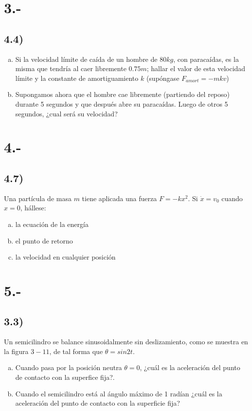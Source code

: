\documentclass{article}
\begin{document}
\section*{3.-}
\subsection*{4.4)}
\begin{enumerate}[a)]
    \item Si la velocidad límite de caída de un hombre de $80kg$, con paracaídas, es 
    la misma que tendría al caer libremente $0.75m$; hallar el valor de esta velocidad 
    límite y la constante de amortiguamiento $k$ (supóngase $F_{amort} = -mkv$)
    \item Supongamos ahora que el hombre cae libremente (partiendo del reposo) durante 
    5 segundos y que después abre su paracaídas. Luego de otros 5 segundos, ¿cual será su 
    velocidad? 
\end{enumerate}
\begin{tcolorbox}[breakable]
    
\end{tcolorbox}

\section*{4.-}
\subsection*{4.7)}
Una partícula de masa $m$ tiene aplicada una fuerza $F=-kx^2$. Si $\dot{x} = v_0$ 
cuando $x=0$, hállese:
\begin{enumerate}[a)]
    \item la ecuación de la energía
    \item el punto de retorno
    \item la velocidad en cualquier posición
\end{enumerate} 
\begin{tcolorbox}[breakable]
    
\end{tcolorbox}

\section*{5.-}
\subsection*{3.3)}
Un semicilindro se balance sinusoidalmente sin deslizamiento, como se muestra en la figura 
$3-11$, de tal forma que $\theta = sin2t$. 
\begin{enumerate}[a)]
    \item Cuando pasa por la posición neutra $\theta=0$, ¿cuál es la aceleración del punto
    de contacto con la superfice fija?. 
    \item Cuando el semicilindro está al ángulo máximo de 1 radían ¿cuál es la aceleración 
    del punto de contacto con la superficie fija?
\end{enumerate}
\begin{tcolorbox}[breakable]
    
\end{tcolorbox}
\end{document}
